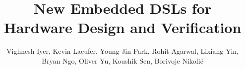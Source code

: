 \documentclass[sigplan,review,nonacm,9pt]{acmart}
\begin{document}
\title{New Embedded DSLs for Hardware Design and Verification}


\author{{\normalsize Vighnesh Iyer, Kevin Laeufer, Young-Jin Park, Rohit Agarwal, Lixiang Yin, Bryan Ngo, Oliver Yu, Koushik Sen, Borivoje Nikolić}}



\end{document}
